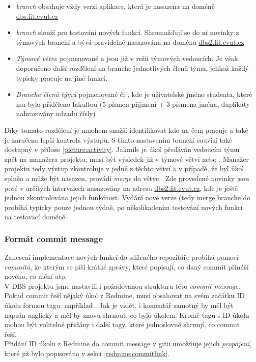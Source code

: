 \begin{itemize}
	\item \emph{ branch} obsahuje vždy verzi aplikace, která je nasazena na doméně \url{dbs.fit.cvut.cz}
	\item \emph{ branch} slouží pro testování nových funkcí. Shromažďují se do ní novinky z týmových branchí a bývá pravidelně nasazována na doménu \url{dbs2.fit.cvut.cz}
	\item \emph{Týmové větve} pojmenované  a  jsou již v režii týmových vedoucích. Je však doporučeno další rozdělení na branche jednotlivých členů týmu, jelikož každý typicky pracuje na jiné funkci.
	\item \emph{Branche členů týmů} pojmenované  či , kde  je uživatelské jméno studenta, které mu bylo přiděleno fakultou (5 písmen příjmení + 3 písmena jména, duplikáty nahrazovány odzadu čísly)
\end{itemize}
Díky tomuto rozdělení je mnohem snažší identifikovat kdo na čem pracuje a také je zaručena lepší kontrola výstupů. S tímto nastavením branchí souvisí také  dostupný v příloze \ref{picture:activity}. Jakmile je úkol předáván vedoucím týmu zpět na manažera projektu, musí být výsledek již v týmové větvi  nebo . Manažer projektu tedy výstup zkontroluje v jedné z těchto větví a v případě, že byl úkol splněn a může být nasazen, provádí \emph{merge} do větve . Zde provedené novinky jsou poté v určitých intervalech nasazovány na adresu \url{dbs2.fit.cvut.cz}, kde je ještě jednou zkontrolována jejich funkčnost. Vydání nové verze (tedy merge branche  do  probíhá typicky pouze jednou týdně, po několikadením testování nových funkcí na testovací doméně.

\subsubsection{Formát commit message} \label{version:git:commit}
Zanesení implementace nových funkcí do sdíleného repozitáře probíhá pomocí \emph{commitů}, ke kterým se píší krátké zprávy, které popisují, co daný commit přináší nového, co mění atp.\\
V DBS projektu jsme nastavili i požadovanou strukturu této \emph{commit message}. Pokud commit řeší nějaký úkol z Redmine, musí obsahovat na svém začátku ID úkolu formou tagu: například . Jak je vidět, i komentář samotný by měl být napsán anglicky a měl by znovu shrnout, co bylo úkolem. Kromě tagu s ID úkolu mohou být volitelně přidány i další tagy, které jednoslovně shrnují, co commit řeší.\\
Přidání ID úkolu z Redmine do commit message v gitu umožňuje jejich \emph{propojení}, které již bylo popisováno v sekci \ref{redmine:commitlink}.

